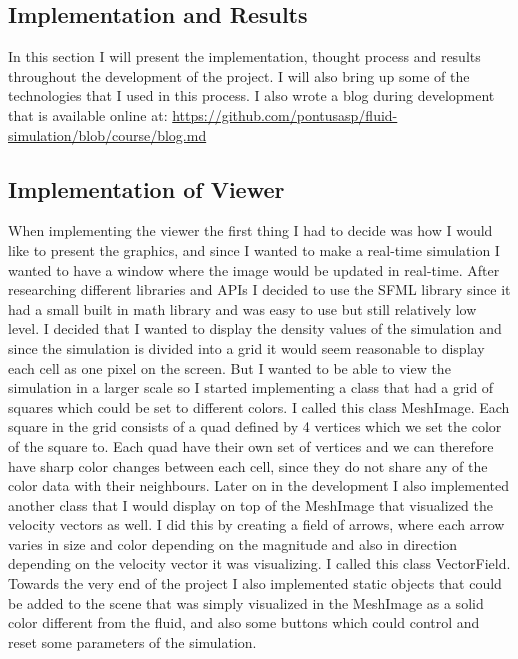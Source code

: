 \documentclass{article}
\begin{document}
\begin{multicols}{2}
\section{Implementation and Results}
In this section I will present the implementation, thought process and results throughout the development of the project. I will also bring up some of the technologies that I used in this process. I also wrote a blog during development that is available online at: \url{https://github.com/pontusasp/fluid-simulation/blob/course/blog.md}

\subsection{Implementation of Viewer}
When implementing the viewer the first thing I had to decide was how I would like to present the graphics, and since I wanted to make a real-time simulation I wanted to have a window where the image would be updated in real-time. After researching different libraries and APIs I decided to use the SFML library since it had a small built in math library and was easy to use but still relatively low level.
I decided that I wanted to display the density values of the simulation and since the simulation is divided into a grid it would seem reasonable to display each cell as one pixel on the screen. But I wanted to be able to view the simulation in a larger scale so I started implementing a class that had a grid of squares which could be set to different colors. I called this class MeshImage. Each square in the grid consists of a quad defined by 4 vertices which we set the color of the square to. Each quad have their own set of vertices and we can therefore have sharp color changes between each cell, since they do not share any of the color data with their neighbours.
Later on in the development I also implemented another class that I would display on top of the MeshImage that visualized the velocity vectors as well. I did this by creating a field of arrows, where each arrow varies in size and color depending on the magnitude and also in direction depending on the velocity vector it was visualizing. I called this class VectorField.
Towards the very end of the project I also implemented static objects that could be added to the scene that was simply visualized in the MeshImage as a solid color different from the fluid, and also some buttons which could control and reset some parameters of the simulation.


\end{multicols}
\end{document}
